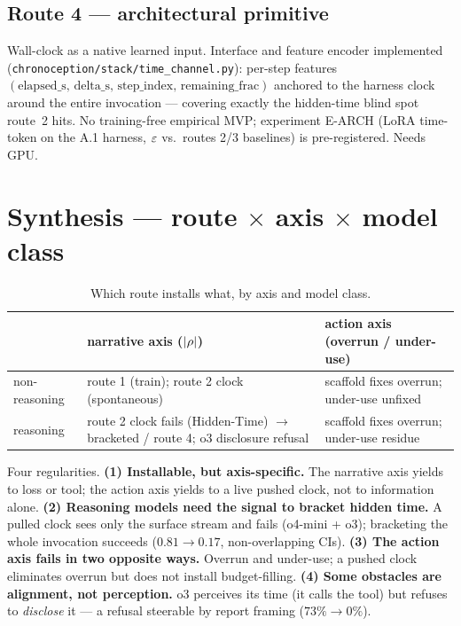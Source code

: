 \documentclass[11pt]{article}
\begin{document}
\subsection{Route 4 --- architectural primitive}
Wall-clock as a native learned input. Interface and feature encoder implemented
(\texttt{chronoception/stack/time\_channel.py}): per-step features
$(\text{elapsed\_s},\,\text{delta\_s},\,\text{step\_index},\,\text{remaining\_frac})$
anchored to the harness clock around the entire invocation --- covering exactly
the hidden-time blind spot route~2 hits. No training-free empirical MVP;
experiment E-ARCH (LoRA time-token on the A.1 harness, $\varepsilon$ vs.\ routes 2/3
baselines) is pre-registered. Needs GPU.

\section{Synthesis --- route $\times$ axis $\times$ model class}

\begin{table}[h]
\centering
\small
\caption{Which route installs what, by axis and model class.}
\begin{tabular}{lll}
\toprule
 & narrative axis ($|\rho|$) & action axis (overrun / under-use) \\
\midrule
non-reasoning & route 1 (train); route 2 clock (spontaneous) & scaffold fixes overrun; under-use unfixed \\
reasoning & route 2 clock fails (Hidden-Time) $\to$ bracketed / route 4; o3 disclosure refusal & scaffold fixes overrun; under-use residue \\
\bottomrule
\end{tabular}
\end{table}

Four regularities. \textbf{(1) Installable, but axis-specific.} The narrative
axis yields to loss or tool; the action axis yields to a live pushed clock, not
to information alone. \textbf{(2) Reasoning models need the signal to bracket
hidden time.} A pulled clock sees only the surface stream and fails (o4-mini +
o3); bracketing the whole invocation succeeds ($0.81 \to 0.17$, non-overlapping
CIs). \textbf{(3) The action axis fails in two opposite ways.} Overrun and
under-use; a pushed clock eliminates overrun but does not install budget-filling.
\textbf{(4) Some obstacles are alignment, not perception.} o3 perceives its time
(it calls the tool) but refuses to \emph{disclose} it --- a refusal steerable by
report framing ($73\% \to 0\%$).
\end{document}
